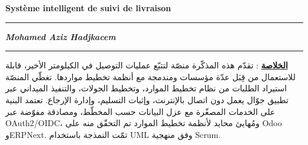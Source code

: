 %
\clearpage
\thispagestyle{empty}
\singlespacing

\begin{center}
  {\bfseries\large Système intelligent de suivi de livraison}
\end{center}
\vspace{-0.2cm}
\noindent\textcolor{isimsblue}{\rule{\textwidth}{1pt}}

\begin{center}
  {\Large\bfseries\itshape Mohamed Aziz Hadjkacem}
\end{center}
\vspace{-0.2cm}
\noindent\textcolor{isimsblue}{\rule{\textwidth}{1pt}}

\vspace{0.3cm}

\begin{Arabic}
\begin{flushright}
\textbf{\underline{الخلاصة}} : تقدّم هذه المذكّرة منصّة لتتبّع عمليات التوصيل في الكيلومتر الأخير،
قابلة للاستعمال من قِبَل عدّة مؤسسات ومندمجة مع أنظمة تخطيط مواردها. تغطّي المنصّة استيراد الطلبات
من نظام تخطيط الموارد، وتخطيط الجولات، والتنفيذ الميداني عبر تطبيق جوّال يعمل دون اتصال بالإنترنت،
وإثبات التسليم، وإدارة الإرجاع. تعتمد البنية على الخدمات المصغّرة مع عزل البيانات حسب المخطّط،
ومصادقة مفوّضة عبر OAuth2/OIDC، ومُهايئ محايد لأنظمة تخطيط الموارد تم التحقّق منه على Odoo
وERPNext. تمّت النمذجة باستخدام UML وفق منهجية Scrum.
\end{flushright}
\end{Arabic}

